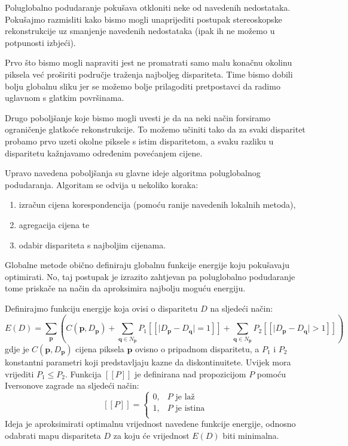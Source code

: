 \documentclass[utf8, zavrsni, numeric]{fer}
\begin{document}
Poluglobalno podudaranje pokušava otkloniti neke od navedenih nedostataka. Pokušajmo razmisliti kako bismo mogli unaprijediti postupak stereoskopske rekonstrukcije uz smanjenje navedenih nedostataka (ipak ih ne možemo u potpunosti izbjeći).

Prvo što bismo mogli napraviti jest ne promatrati samo malu konačnu okolinu piksela već proširiti područje traženja najboljeg dispariteta. Time bismo dobili bolju globalnu sliku jer se možemo bolje prilagoditi pretpostavci da radimo uglavnom s glatkim površinama.

Drugo poboljšanje koje bismo mogli uvesti je da na neki način forsiramo ograničenje glatkoće rekonstrukcije.
To možemo učiniti tako da za svaki disparitet probamo prvo uzeti okolne piksele s istim disparitetom, a svaku razliku u disparitetu kažnjavamo određenim povećanjem cijene.

Upravo navedena poboljšanja su glavne ideje algoritma poluglobalnog podudaranja. Algoritam se odvija u nekoliko koraka:
\begin{enumerate}
  \item izračun cijena korespondencija (pomoću ranije navedenih lokalnih metoda),
  \item agregacija cijena te
  \item odabir dispariteta s najboljim cijenama.
\end{enumerate}

Globalne metode obično definiraju globalnu funkcije energije koju pokušavaju optimirati.
No, taj postupak je izrazito zahtjevan pa poluglobalno podudaranje tome priskače na način
da aproksimira najbolju moguću energiju.

Definirajmo funkciju energije koja ovisi o disparitetu $D$ na sljedeći način:
\begin{equation} \label{energija}
E(D) = \sum_{\mathbf{p}}(C(\mathbf{p}, D_{\mathbf{p}}) + \sum_{\mathbf{q} \in N_{\mathbf{p}}} P_1 [\![\lvert D_{\mathbf{p}} - D_{\mathbf{q}}\rvert = 1]\!] + \sum_{\mathbf{q} \in N_{\mathbf{p}}} P_2 [\![\lvert D_{\mathbf{p}} - D_{\mathbf{q}}\rvert > 1]\!])
\end{equation}
gdje je $C(\mathbf{p}, D_{\mathbf{p}})$ cijena piksela $\mathbf{p}$ ovisno o pripadnom disparitetu, a $P_1$ i $P_2$ konstantni parametri koji predstavljaju kazne da diskontinuitete. Uvijek mora vrijediti $P_1 \leq P_2$.
Funkcija $[\![P]\!]$ je definirana nad propozicijom $P$ pomoću Iversonove zagrade na sljedeći način:
\[   
[\![P]\!] = 
     \begin{cases}
       0, & P \text{ je laž} \\
       1, & P \text{ je istina} \\
     \end{cases}
\]
Ideja je aproksimirati optimalnu vrijednost navedene funkcije energije, odnosno odabrati
mapu dispariteta $D$ za koju će vrijednost $E(D)$ biti minimalna.
\end{document}
